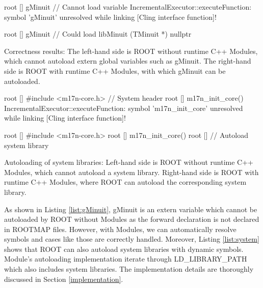 \documentclass{webofc}
\begin{document}
\begin{listing}[h]
    \noindent
    \begin{minipage}[h]{.48\textwidth}
    \begin{cppcode*}{}
root [] gMinuit // Cannot load variable
IncrementalExecutor::executeFunction:
symbol 'gMinuit' unresolved while
linking [Cling interface function]!
    \end{cppcode*}
    \end{minipage}\hfill
    \begin{minipage}[h]{.48\textwidth}
    \begin{cppcode*}{}
root [] gMinuit // Could load libMinuit
(TMinuit *) nullptr
    \end{cppcode*}
    \end{minipage}
    \caption{Correctness results: The left-hand side is ROOT without runtime C++ Modules, which cannot autoload extern global variables such as gMinuit. The right-hand side is ROOT with runtime C++ Modules, with which gMinuit can be autoloaded.}
    \label{list:gMinuit}
\end{listing}

\begin{listing}[h]
    \noindent
    \begin{minipage}[h]{.48\textwidth}
    \begin{cppcode*}{}
root [] #include <m17n-core.h> // System header
root [] m17n_init_core()
IncrementalExecutor::executeFunction:
symbol 'm17n_init_core' unresolved while
linking [Cling interface function]!
    \end{cppcode*}
    \end{minipage}\hfill
    \begin{minipage}[h]{.48\textwidth}
    \begin{cppcode*}{}
root [] #include <m17n-core.h>
root [] m17n_init_core()
root [] // Autoload system library
    \end{cppcode*}
    \end{minipage}
    \caption{Autoloading of system libraries: Left-hand side is ROOT without runtime C++ Modules, which cannot autoload a system library. Right-hand side is ROOT with runtime C++ Modules, where ROOT can autoload the corresponding system library.}
    \label{list:system}
\end{listing}

As shown in Listing \ref{list:gMinuit}, gMinuit is an extern variable which cannot be autoloaded by ROOT without Modules as the forward declaration is not declared in ROOTMAP files. However, with Modules, we can automatically resolve symbols and cases like those are correctly handled. Moreover, Listing \ref{list:system} shows that ROOT can also autoload system libraries with dynamic symbols. Module's autoloading implementation iterate through LD\_LIBRARY\_PATH which also includes system libraries. The implementation details are thoroughly discussed in Section \ref{implementation}.
\end{document}
